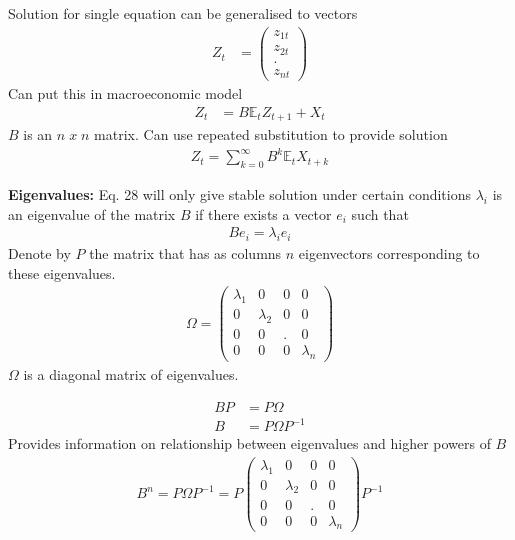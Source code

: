 \documentclass{beamer}
\begin{document}
\begin{frame}
  Solution for single equation can be generalised to vectors
  \begin{align}
    Z_t&=\begin{pmatrix}      z_{1t} \\ z_{2t} \\ . \\ z_{nt}  \end{pmatrix}     
\end{align}
 Can put this in macroeconomic model
 \begin{align}
   Z_t&=B\mathbb{E}_tZ_{t+1} + X_t
 \end{align}
$B$ is an $n\; x\; n$ matrix. Can use repeated substitution to provide solution
  \begin{align}  
  Z_t=\sum^{\infty}_{k=0}B^k \mathbb{E}_t X_{t+k}  
\end{align}
\end{frame}

\begin{frame}
  \textbf{Eigenvalues:} Eq. 28 will only give stable solution under certain conditions
  $\lambda_i$ is an eigenvalue of the matrix $B$ if there exists a vector $e_i$ such that 
  \begin{align}
     Be_i=\lambda_i e_i 
  \end{align}
  Denote by $P$ the matrix that has as columns $n$ eigenvectors corresponding to these eigenvalues. 
\begin{align}
  \Omega=\begin{pmatrix}
    \lambda_1 &0 &0 &0\\
    0 &\lambda_2 &0 &0\\
    0 & 0 & . &0\\
    0 &0 &0 & \lambda_n
  \end{pmatrix}
\end{align}
$\Omega$ is a diagonal matrix of eigenvalues. 
\end{frame}

\begin{frame}
  \begin{align}
    BP&=P\Omega \\ \nonumber
    B&=P\Omega P^{-1}
  \end{align}
  Provides information on relationship between eigenvalues and higher powers of $B$
\begin{align}
  B^n=P\Omega P^{-1} = P \begin{pmatrix}
    \lambda_1 &0 &0 &0\\
    0 &\lambda_2 &0 &0\\
    0 & 0 & . &0\\
    0 &0 &0 & \lambda_n
  \end{pmatrix}
  P^{-1}
\end{align}
\end{frame}
\end{document}
